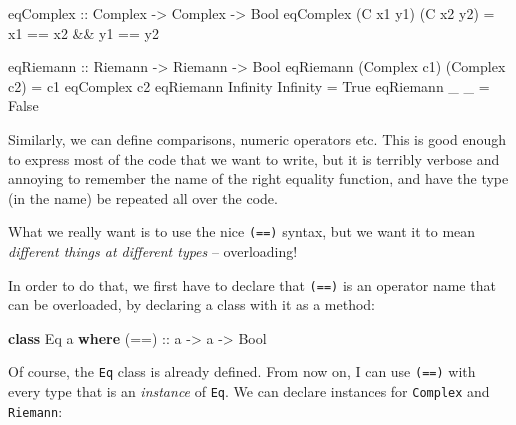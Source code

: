 \documentclass[11pt,
  american,
  DIV13]{article}
\newenvironment{Shaded}{}{}
\newcommand{\DataTypeTok}[1]{\textcolor[rgb]{0.56,0.13,0.00}{#1}}
\newcommand{\KeywordTok}[1]{\textcolor[rgb]{0.00,0.44,0.13}{\textbf{#1}}}
\newcommand{\NormalTok}[1]{#1}
\newcommand{\OperatorTok}[1]{\textcolor[rgb]{0.40,0.40,0.40}{#1}}
\newcommand{\OtherTok}[1]{\textcolor[rgb]{0.00,0.44,0.13}{#1}}
\begin{document}
\begin{Shaded}
\begin{Highlighting}[]
\OtherTok{eqComplex ::} \DataTypeTok{Complex} \OtherTok{{-}\textgreater{}} \DataTypeTok{Complex} \OtherTok{{-}\textgreater{}} \DataTypeTok{Bool}
\NormalTok{eqComplex (}\DataTypeTok{C}\NormalTok{ x1 y1) (}\DataTypeTok{C}\NormalTok{ x2 y2) }\OtherTok{=}\NormalTok{ x1 }\OperatorTok{==}\NormalTok{ x2 }\OperatorTok{\&\&}\NormalTok{ y1 }\OperatorTok{==}\NormalTok{ y2}

\OtherTok{eqRiemann ::} \DataTypeTok{Riemann} \OtherTok{{-}\textgreater{}} \DataTypeTok{Riemann} \OtherTok{{-}\textgreater{}} \DataTypeTok{Bool}
\NormalTok{eqRiemann (}\DataTypeTok{Complex}\NormalTok{ c1) (}\DataTypeTok{Complex}\NormalTok{ c2) }\OtherTok{=}\NormalTok{ c1 }\OtherTok{\textasciigrave{}eqComplex\textasciigrave{}}\NormalTok{ c2}
\NormalTok{eqRiemann }\DataTypeTok{Infinity} \DataTypeTok{Infinity} \OtherTok{=} \DataTypeTok{True}
\NormalTok{eqRiemann \_ \_ }\OtherTok{=} \DataTypeTok{False}
\end{Highlighting}
\end{Shaded}

Similarly, we can define comparisons, numeric operators etc. This is
good enough to express most of the code that we want to write, but it is
terribly verbose and annoying to remember the name of the right equality
function, and have the type (in the name) be repeated all over the code.

What we really want is to use the nice \texttt{(==)} syntax, but we want
it to mean \emph{different things at different types} -- overloading!

In order to do that, we first have to declare that \texttt{(==)} is an
operator name that can be overloaded, by declaring a class with it as a
method:

\begin{Shaded}
\begin{Highlighting}[]
\KeywordTok{class} \DataTypeTok{Eq}\NormalTok{ a }\KeywordTok{where}
\OtherTok{    (==) ::}\NormalTok{ a }\OtherTok{{-}\textgreater{}}\NormalTok{ a }\OtherTok{{-}\textgreater{}} \DataTypeTok{Bool}
\end{Highlighting}
\end{Shaded}

Of course, the \texttt{Eq} class is already defined. From now on, I can
use \texttt{(==)} with every type that is an \emph{instance} of
\texttt{Eq}. We can declare instances for \texttt{Complex} and
\texttt{Riemann}:
\end{document}
